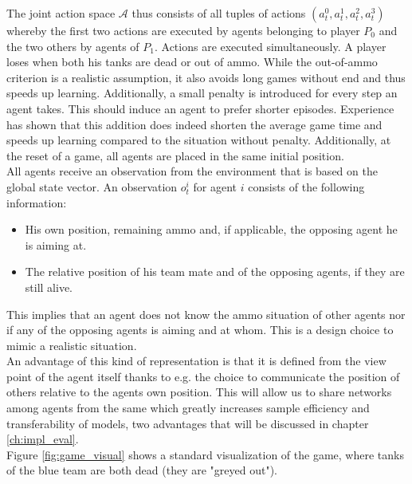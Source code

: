 The joint action space $\mathcal{A}$ thus consists of all tuples of actions $(a_t^0, a_t^1, a_t^2, a_t^3)$ whereby the first two actions are executed by agents belonging to player $P_0$ and the two others by agents of $P_1$. Actions are executed simultaneously. A player loses when both his tanks are dead or out of ammo. While the out-of-ammo criterion is a realistic assumption, it also avoids long games without end and thus speeds up learning. Additionally, a small penalty is introduced for every step an agent takes. This should induce an agent to prefer shorter episodes. Experience has shown that this addition does indeed shorten the average game time and speeds up learning compared to the situation without penalty. Additionally, at the reset of a game, all agents are placed in the same initial position.\\
All agents receive an observation from the environment that is based on the global state vector. An observation $o^i_t$ for agent $i$ consists of the following information:
\begin{itemize}
    \item His own position, remaining ammo and, if applicable, the opposing agent he is aiming at.
    \item The relative position of his team mate and of the opposing agents, if they are still alive.
\end{itemize}
This implies that an agent does not know the ammo situation of other agents nor if any of the opposing agents is aiming and at whom. This is a design choice to mimic a realistic situation.\\
An advantage of this kind of representation is that it is defined from the view point of the agent itself thanks to e.g. the choice to communicate the position of others relative to the agents own position. This will allow us to share networks among agents from the same which greatly increases sample efficiency and transferability of models, two advantages that will be discussed in chapter \ref{ch:impl_eval}.\\
Figure \ref{fig:game_visual} shows a standard visualization of the game, where tanks of the blue team are both dead (they are "greyed out").

